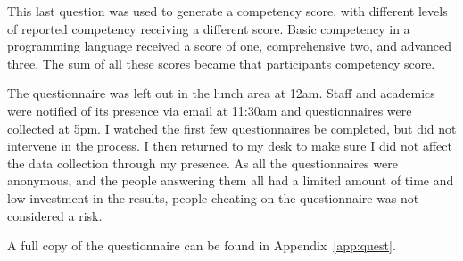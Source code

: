 This last question was used to generate a competency score, with different levels of reported competency receiving a different score. Basic competency in a programming language received a score of one, comprehensive two, and advanced three. The sum of all these scores became that participants competency score.

The questionnaire was left out in the lunch area at 12am. Staff and academics were notified of its presence via email at 11:30am and questionnaires were collected at 5pm. I watched the first few questionnaires be completed, but did not intervene in the process. I then returned to my desk to make sure I did not affect the data collection through my presence. As all the questionnaires were anonymous, and the people answering them all had a limited amount of time and low investment in the results, people cheating on the questionnaire was not considered a risk. 

A full copy of the questionnaire can be found in Appendix~\ref{app:quest}.
